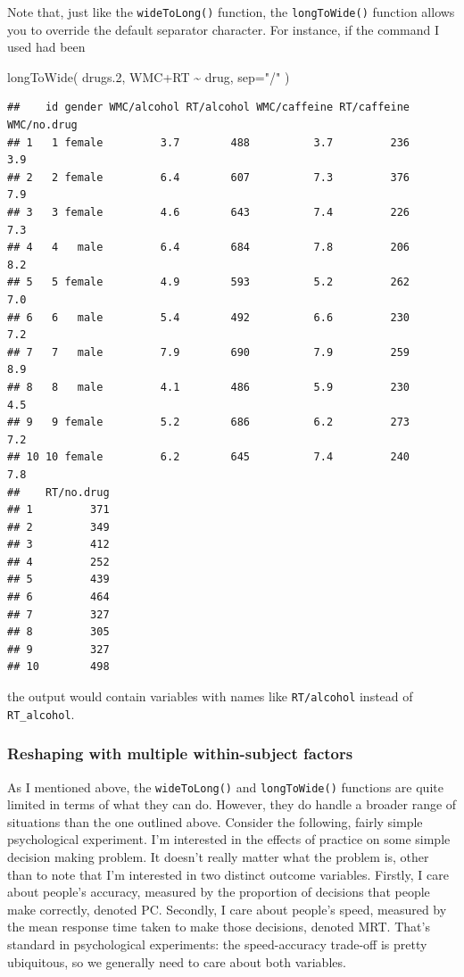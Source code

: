 \documentclass[
]{book}
\newenvironment{Shaded}{\begin{snugshade}}{\end{snugshade}}
\newcommand{\AttributeTok}[1]{\textcolor[rgb]{0.77,0.63,0.00}{#1}}
\newcommand{\FloatTok}[1]{\textcolor[rgb]{0.00,0.00,0.81}{#1}}
\newcommand{\FunctionTok}[1]{\textcolor[rgb]{0.00,0.00,0.00}{#1}}
\newcommand{\NormalTok}[1]{#1}
\newcommand{\SpecialCharTok}[1]{\textcolor[rgb]{0.00,0.00,0.00}{#1}}
\newcommand{\StringTok}[1]{\textcolor[rgb]{0.31,0.60,0.02}{#1}}
\begin{document}
Note that, just like the \texttt{wideToLong()} function, the \texttt{longToWide()} function allows you to override the default separator character. For instance, if the command I used had been

\begin{Shaded}
\begin{Highlighting}[]
\FunctionTok{longToWide}\NormalTok{( drugs}\FloatTok{.2}\NormalTok{, WMC}\SpecialCharTok{+}\NormalTok{RT }\SpecialCharTok{\textasciitilde{}}\NormalTok{ drug, }\AttributeTok{sep=}\StringTok{"/"}\NormalTok{ )}
\end{Highlighting}
\end{Shaded}

\begin{verbatim}
##    id gender WMC/alcohol RT/alcohol WMC/caffeine RT/caffeine WMC/no.drug
## 1   1 female         3.7        488          3.7         236         3.9
## 2   2 female         6.4        607          7.3         376         7.9
## 3   3 female         4.6        643          7.4         226         7.3
## 4   4   male         6.4        684          7.8         206         8.2
## 5   5 female         4.9        593          5.2         262         7.0
## 6   6   male         5.4        492          6.6         230         7.2
## 7   7   male         7.9        690          7.9         259         8.9
## 8   8   male         4.1        486          5.9         230         4.5
## 9   9 female         5.2        686          6.2         273         7.2
## 10 10 female         6.2        645          7.4         240         7.8
##    RT/no.drug
## 1         371
## 2         349
## 3         412
## 4         252
## 5         439
## 6         464
## 7         327
## 8         305
## 9         327
## 10        498
\end{verbatim}

the output would contain variables with names like \texttt{RT/alcohol} instead of \texttt{RT\_alcohol}.

\hypertarget{reshaping-with-multiple-within-subject-factors}{%
\subsubsection{Reshaping with multiple within-subject factors}\label{reshaping-with-multiple-within-subject-factors}}

As I mentioned above, the \texttt{wideToLong()} and \texttt{longToWide()} functions are quite limited in terms of what they can do. However, they do handle a broader range of situations than the one outlined above. Consider the following, fairly simple psychological experiment. I'm interested in the effects of practice on some simple decision making problem. It doesn't really matter what the problem is, other than to note that I'm interested in two distinct outcome variables. Firstly, I care about people's accuracy, measured by the proportion of decisions that people make correctly, denoted PC. Secondly, I care about people's speed, measured by the mean response time taken to make those decisions, denoted MRT. That's standard in psychological experiments: the speed-accuracy trade-off is pretty ubiquitous, so we generally need to care about both variables.
\end{document}
